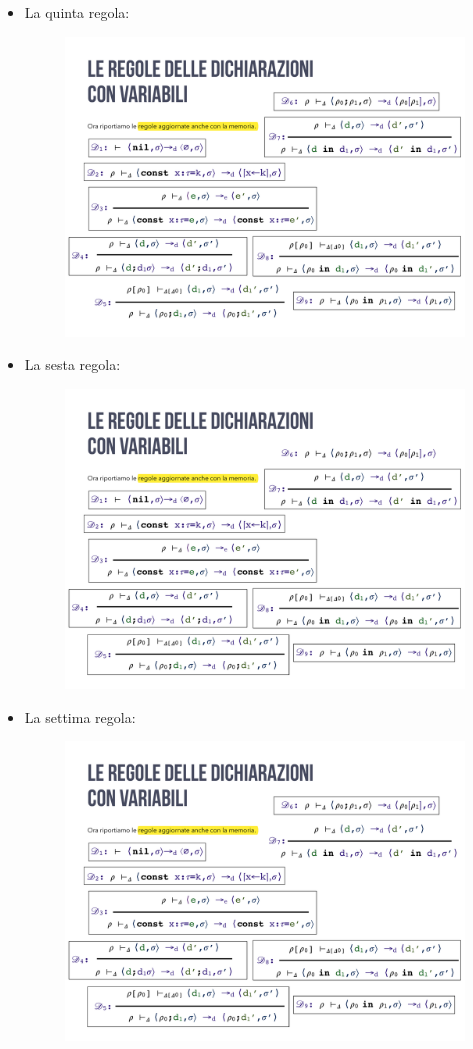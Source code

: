 \documentclass[a4paper]{article}
\begin{document}
\begin{itemize}
 		\item La quinta regola:
 		\begin{figure}[!htp]
 			\centering
 			\includegraphics[width=.9\textwidth]{img/regola_dichiarazione-up-5.pdf}
 		\end{figure}
 		
 		\item La sesta regola:
 		\begin{figure}[!htp]
 			\centering
 			\includegraphics[width=.7\textwidth]{img/regola_dichiarazione-up-6.pdf}
 		\end{figure}\newpage
 	
 		\item La settima regola:
 		\begin{figure}[!htp]
 			\centering
 			\includegraphics[width=.8\textwidth]{img/regola_dichiarazione-up-7.pdf}
 		\end{figure}
 	

\end{itemize}
\end{document}
